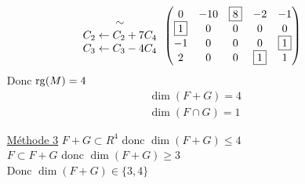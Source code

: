 \begin{itemize}
\begin{align*}
\begin{array}{c}
					\sim\\
					C_2\leftarrow C_2 + 7C_4\\
					C_3\leftarrow C_3 - 4C_4
				\end{array}&
				\begin{pmatrix}
					0&-10&\boxed8&-2&-1\\
					\boxed1&0&0&0&0\\
					-1&0&0&0&\boxed1\\
					2&0&0&\boxed1&1
				\end{pmatrix}
		\end{align*}
		Donc $\operatorname{rg}(M) = 4$ \[
			\boxed{
				\begin{array}{c}
					\dim(F+G) = 4\\
					\dim(F \cap G) = 1
				\end{array} 
			}
		\]
	\item[\underline{\sc Méthode 3}] $F + G \subset R^4$ donc $\dim(F +G) \le 4$ \\
		$F \subset F+G$ donc $\dim(F+G) \ge 3$ \\
		Donc $\dim(F+G) \in \{3, 4\}$\\


\end{itemize}
